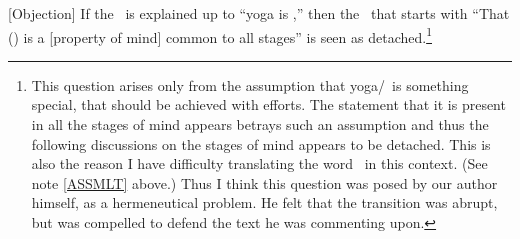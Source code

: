 [Objection]%
 If the \sutra\ is explained up to ``yoga is
\samadhi,'' then the \bhasya\ that starts with ``That (\samadhi) is a [property of mind] common to all stages'' is seen as detached.\footnote{This question arises only from the assumption that yoga/\samadhi\ is something special, that should be achieved with efforts.  The statement that it is present in all the stages of mind appears betrays such an assumption and thus the following discussions on the stages of mind appears to be detached. This is also the reason I have difficulty translating the word \samadhi\ in this context.  (See note \ref{ASSMLT} above.) Thus I think this question was posed by our author himself, as a hermeneutical problem.  He felt that the transition was abrupt, but was compelled to defend the text he was commenting upon.}

